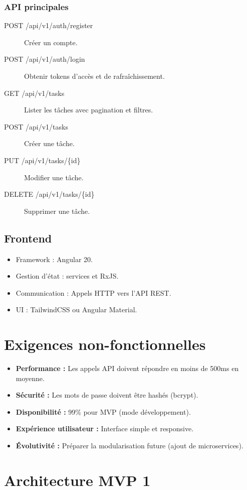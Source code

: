 \subsubsection{API principales}
\begin{description}
	\item[POST /api/v1/auth/register] Créer un compte.
	\item[POST /api/v1/auth/login] Obtenir tokens d'accès et de rafraîchissement.
	\item[GET /api/v1/tasks] Lister les tâches avec pagination et filtres.
	\item[POST /api/v1/tasks] Créer une tâche.
	\item[PUT /api/v1/tasks/\{id\}] Modifier une tâche.
	\item[DELETE /api/v1/tasks/\{id\}] Supprimer une tâche.
\end{description}

\subsection{Frontend}
\begin{itemize}
	\item Framework : Angular 20.
	\item Gestion d’état : services et RxJS.
	\item Communication : Appels HTTP vers l’API REST.
	\item UI : TailwindCSS ou Angular Material.
\end{itemize}

\section{Exigences non-fonctionnelles}
\begin{itemize}
	\item \textbf{Performance :} Les appels API doivent répondre en moins de 500ms en moyenne.
	\item \textbf{Sécurité :} Les mots de passe doivent être hashés (bcrypt).
	\item \textbf{Disponibilité :} 99\% pour MVP (mode développement).
	\item \textbf{Expérience utilisateur :} Interface simple et responsive.
	\item \textbf{Évolutivité :} Préparer la modularisation future (ajout de microservices).
\end{itemize}

\section{Architecture MVP 1}
